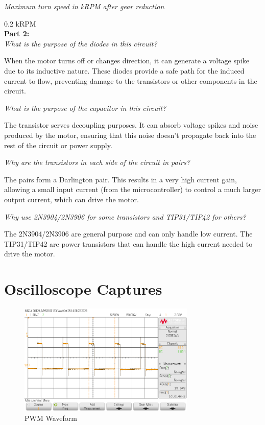 \documentclass[CMPE]{KGCOEReport}
\begin{document}
\emph{Maximum turn speed in kRPM after gear reduction}

0.2 kRPM\\


\textbf{Part 2:}\\

\emph{What is the purpose of the diodes in this circuit?}

When the motor turns off or changes direction, it can generate a voltage spike due to its inductive nature. These diodes provide a safe path for the induced current to flow, preventing damage to the transistors or other components in the circuit.
\bigskip

\emph{What is the purpose of the capacitor in this circuit?}

The transistor serves decoupling purposes. It can absorb voltage spikes and noise produced by the motor, ensuring that this noise doesn't propagate back into the rest of the circuit or power supply.
\bigskip

\emph{Why are the transistors in each side of the circuit in pairs?}

The pairs form a Darlington pair. This results in a very high current gain, allowing a small input current (from the microcontroller) to control a much larger output current, which can drive the motor.
\bigskip

\emph{Why use 2N3904/2N3906 for some transistors and TIP31/TIP42 for others?}

The 2N3904/2N3906 are general purpose and can only handle low current. The TIP31/TIP42 are power transistors that can handle the high current needed to drive the motor.

\section*{Oscilloscope Captures}

\begin{figure}[H]
    \centering
    \includegraphics[width=0.75\textwidth]{PWM.png}
    \caption{PWM Waveform}
    \label{fig:pwm}
\end{figure}
\end{document}
